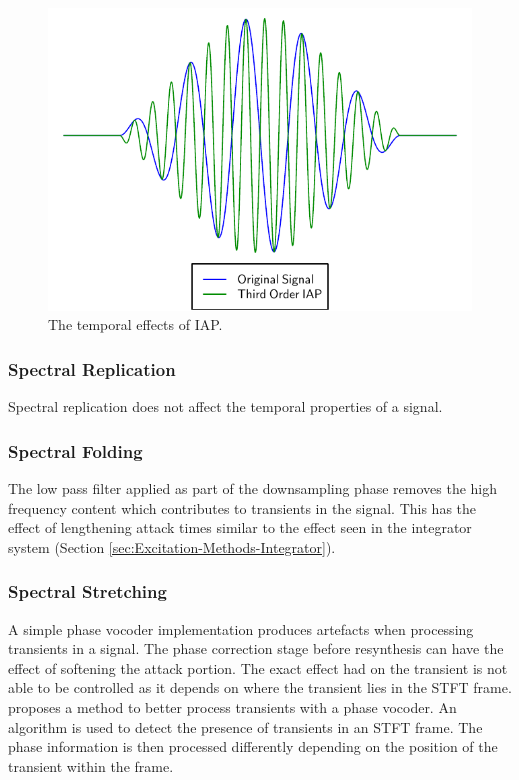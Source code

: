 			\begin{figure}[h!]
				\centering
				\includegraphics{chapter5/Images/IAPTemporalEffects.pdf}
				\caption{The temporal effects of IAP.}
				\label{fig:IAPTemporalEffects}
			\end{figure}
			
		\subsubsection*{Spectral Replication}
			Spectral replication does not affect the temporal properties of a signal.

		\subsubsection*{Spectral Folding}
			The low pass filter applied as part of the downsampling phase removes the high frequency content
			which contributes to transients in the signal. This has the effect of lengthening attack times
			similar to the effect seen in the integrator system (Section
			\ref{sec:Excitation-Methods-Integrator}).

		\subsubsection*{Spectral Stretching}
			A simple phase vocoder implementation produces artefacts when processing transients in a signal.
			The phase correction stage before resynthesis can have the effect of softening the attack portion.
			The exact effect had on the transient is not able to be controlled as it depends on where the
			transient lies in the STFT frame. \citet{robel2003a} proposes a method to better process transients
			with a phase vocoder. An algorithm is used to detect the presence of transients in an STFT frame.
			The phase information is then processed differently depending on the position of the transient
			within the frame.

